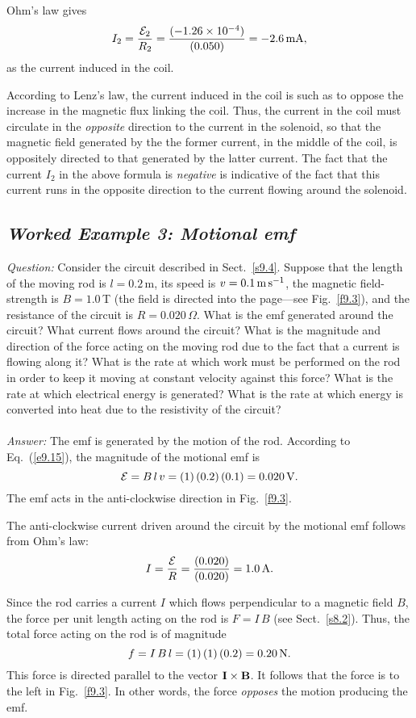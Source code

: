 Ohm's law gives
$$
I_2 = \frac{{\cal E}_2}{R_2} = \frac{(-1.26\times 10^{-4})}{(0.050)} = -2.6\,{\rm mA},
$$
as the current induced in the coil. 

According to Lenz's law, the current induced  in the coil is such as to 
oppose the increase in the  magnetic flux linking  the coil. Thus, the current
in the coil must circulate in the {\em opposite} direction to the current  in
the solenoid, so that the magnetic field generated by the the former current, in the middle of
the coil, is oppositely directed to that generated by the latter current.
The fact that the current $I_2$ in the above formula is {\em negative} 
is indicative of the fact  that
this current 
runs in the opposite direction to the current flowing around the solenoid. 


\subsection*{\em Worked Example 3: Motional emf}
{\em Question:} Consider the circuit described in Sect.~\ref{s9.4}.
Suppose that the length of the moving rod is $l=0.2$\,m,  its speed
is $v=0.1\,{\rm m\,s}^{-1}$,  the magnetic field-strength is $B=1.0$\,T 
(the field is directed into the page---see Fig.~\ref{f9.3}), and the resistance of the circuit is
$R=0.020\,\Omega$. What is the emf generated around the circuit? What current
flows around the circuit? What is the magnitude and direction of the force
acting on the moving rod due to the fact that a current is flowing along it?
What is the rate at which work must be performed on the rod in order to
keep it moving at constant velocity against this force? What is the rate at
which electrical energy is generated? What is the rate at which energy is converted
into heat due to the resistivity of the circuit?\\
~\\
{\em Answer:} The emf is generated by the motion of the rod. According to
Eq.~(\ref{e9.15}), the magnitude of the motional emf is
$$
{\cal E} = B\,l\,v = (1)\,(0.2)\,(0.1) = 0.020\,{\rm V}.
$$
The emf acts in the anti-clockwise direction in Fig.~\ref{f9.3}.

The anti-clockwise current driven around the circuit by the motional
emf follows from Ohm's law:
$$
I = \frac{\cal E}{R} = \frac{(0.020)}{(0.020)} = 1.0\,{\rm A}.
$$

Since the rod carries a current $I$ which flows perpendicular to a magnetic
field $B$, the force per unit length acting on the rod is 
$F= I\,B$ (see Sect.~\ref{s8.2}). Thus, the total force acting on the rod is of magnitude
$$
f = I\,B\,l = (1)\,(1)\,(0.2) = 0.20\,{\rm N}.
$$
This force is directed parallel to the vector ${\bf I}\times {\bf B}$.
It follows that the force is to the left in Fig.~\ref{f9.3}. In other words, the force {\em opposes} the motion producing the
emf.

